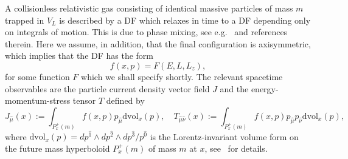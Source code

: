 \documentclass{appolb}
\newcommand{\dvol}{\mbox{dvol}}
\begin{document}
A collisionless relativistic gas consisting of identical massive particles of mass $m$ trapped in $V_L$ is described by a DF which relaxes in time to a DF depending only on integrals of motion. This is due to phase mixing, see e.g.~\cite{pRoS18a,pRoS20} and references therein. Here we assume, in addition, that the final configuration is axisymmetric, which implies that the DF has the form
\begin{equation}
f(x, p) = F(E,L,L_z),
\label{Eq:OneParticleDistributionFunction}
\end{equation}
for some function $F$ which we shall specify shortly. The relevant spacetime observables are the particle current density vector field $J$ and the energy-momentum-stress tensor $T$ defined by
\begin{equation}
J_{\hat{\mu}}(x) := \int_{P_x^+(m)} f(x, p) p_{\hat{\mu}} \dvol_x(p), \quad
T_{\hat{\mu}\hat{\nu}} (x) := \int_{P_x^+(m)} f(x, p) p_{\hat{\mu}} p_{\hat{\nu}} \dvol_x(p),\quad
\label{Eq:JT}
\end{equation}
where $\dvol_x(p) = dp^{\hat{1}}\wedge dp^{\hat{2}}\wedge dp^{\hat{3}}/p^{\hat{0}}$ is the Lorentz-invariant volume form on the future mass hyperboloid  $P_x^+(m)$ of mass $m$ at $x$, see~\cite{rAcGoS2021} for details.
\end{document}

